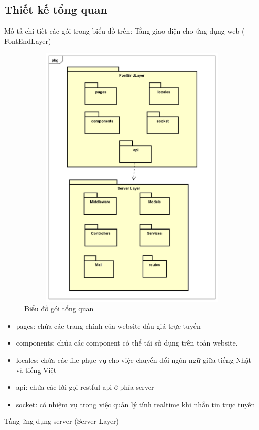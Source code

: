 \documentclass[../DoAn.tex]{subfiles}
\begin{document}
\subsection{Thiết kế tổng quan}
Mô tả chi tiết các gói trong biểu đồ trên: 
Tầng giao diện cho ứng dụng web ( FontEndLayer)
\begin{figure}[H]
    \centering
    \includegraphics[width=11.4cm,height=12.92cm]{Hinhve/gói tổng quan.png}
    \caption{Biểu đồ gói tổng quan}
    \label{fig:Fig43}
\end{figure}
\begin{itemize}
    \item pages: chứa các trang chính của website đấu giá trực tuyến
    \item components: chứa các component có thể tái sử dụng trên toàn website.
    \item locales: chứa các file phục vụ cho việc chuyển đổi ngôn ngữ giữa tiếng Nhật và tiếng Việt
    \item api: chứa các lời gọi restful api ở phía server
    \item socket: có nhiệm vụ trong việc quản lý tính realtime khi nhắn tin trực tuyến
\end{itemize}
Tầng ứng dụng server (Server Layer)
\end{document}
